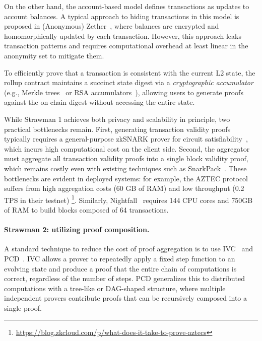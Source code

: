 On the other hand, the account-based model defines transactions as updates to account balances.
A typical approach to hiding transactions in this model is proposed in (Anonymous) Zether~\cite{FC:BAZB20}, where balances are encrypted and homomorphically updated by each transaction.
However, this approach leaks transaction patterns and requires computational overhead at least linear in the anonymity set to mitigate them.

To efficiently prove that a transaction is consistent with the current \ac{L2} state, the rollup contract maintains a succinct state digest via a \textit{cryptographic accumulator}~\cite{EC:BendMa93} (e.g., Merkle trees~\cite{C:Merkle87} or RSA accumulators~\cite{EC:BarPfi97}), allowing users to generate proofs against the on-chain digest without accessing the entire state.

While Strawman 1 achieves both privacy and scalability in principle, two practical bottlenecks remain.
First, generating transaction validity proofs typically requires a general-purpose \ac{zkSNARK} prover for circuit satisfiability~\cite{EC:Groth16,EPRINT:GabWilCio19}, which incurs high computational cost on the client side.
Second, the aggregator must aggregate all transaction validity proofs into a single block validity proof, which remains costly even with existing techniques such as SnarkPack~\cite{FC:GaiMalNit22}.
These bottlenecks are evident in deployed systems: for example, the \ac{AZTEC} protocol suffers from high aggregation costs (60 GB of RAM) and low throughput (0.2 TPS in their testnet) \footnote{\url{https://blog.zkcloud.com/p/what-does-it-take-to-prove-aztecs}}.
Similarly, Nightfall~\cite{nightfall4} requires 144 CPU cores and 750GB of RAM to build blocks composed of 64 transactions.

\paragraph{Strawman 2: utilizing proof composition.}

A standard technique to reduce the cost of proof aggregation is to use \ac{IVC}~\cite{TCC:Valiant08} and \ac{PCD}~\cite{ITCS:ChiTro10}.
\ac{IVC} allows a prover to repeatedly apply a fixed step function to an evolving state and produce a proof that the entire chain of computations is correct, regardless of the number of steps.
\ac{PCD} generalizes this to distributed computations with a tree-like or DAG-shaped structure, where multiple independent provers contribute proofs that can be recursively composed into a single proof.

